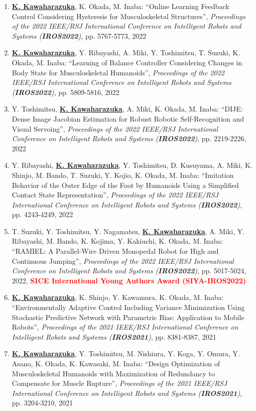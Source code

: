 \documentclass[letterpaper]{article}
\begin{document}
\begin{enumerate}
\item \underline{\textbf{K. Kawaharazuka}}, K. Okada, M. Inaba: ``Online Learning Feedback Control Considering Hysteresis for Musculoskeletal Structures'', \textit{Proceedings of the 2022 IEEE/RSJ International Conference on Intelligent Robots and Systems (\textit{\textbf{IROS2022}})}, pp. 5767-5773, 2022
\item \underline{\textbf{K. Kawaharazuka}}, Y. Ribayashi, A. Miki, Y. Toshimitsu, T. Suzuki, K. Okada, M. Inaba: ``Learning of Balance Controller Considering Changes in Body State for Musculoskeletal Humanoids'', \textit{Proceedings of the 2022 IEEE/RSJ International Conference on Intelligent Robots and Systems (\textit{\textbf{IROS2022}})}, pp. 5809-5816, 2022
\item Y. Toshimitsu, \underline{\textbf{K. Kawaharazuka}}, A. Miki, K. Okada, M. Inaba: ``DIJE: Dense Image Jacobian Estimation for Robust Robotic Self-Recognition and Visual Servoing'', \textit{Proceedings of the 2022 IEEE/RSJ International Conference on Intelligent Robots and Systems (\textit{\textbf{IROS2022}})}, pp. 2219-2226, 2022
\item Y. Ribayashi, \underline{\textbf{K. Kawaharazuka}}, Y. Toshimitsu, D. Kusuyama, A. Miki, K. Shinjo, M. Bando, T. Suzuki, Y. Kojio, K. Okada, M. Inaba: ``Imitation Behavior of the Outer Edge of the Foot by Humanoids Using a Simplified Contact State Representation'', \textit{Proceedings of the 2022 IEEE/RSJ International Conference on Intelligent Robots and Systems (\textit{\textbf{IROS2022}})}, pp. 4243-4249, 2022
\item T. Suzuki, Y. Toshimitsu, Y. Nagamatsu, \underline{\textbf{K. Kawaharazuka}}, A. Miki, Y. Ribayashi, M. Bando, K. Kojima, Y. Kakiuchi, K. Okada, M. Inaba: ``RAMIEL: A Parallel-Wire Driven Monopedal Robot for High and Continuous Jumping'', \textit{Proceedings of the 2022 IEEE/RSJ International Conference on Intelligent Robots and Systems (\textit{\textbf{IROS2022}})}, pp. 5017-5024, 2022, \textbf{\textcolor{red}{SICE International Young Authors Award (SIYA-IROS2022)}}
\item \underline{\textbf{K. Kawaharazuka}}, K. Shinjo, Y. Kawamura, K. Okada, M. Inaba: ``Environmentally Adaptive Control Including Variance Minimization Using Stochastic Predictive Network with Parametric Bias: Application to Mobile Robots'', \textit{Proceedings of the 2021 IEEE/RSJ International Conference on Intelligent Robots and Systems (\textit{\textbf{IROS2021}})}, pp. 8381-8387, 2021
\item \underline{\textbf{K. Kawaharazuka}}, Y. Toshimitsu, M. Nishiura, Y. Koga, Y. Omura, Y. Asano, K. Okada, K. Kawasaki, M. Inaba: ``Design Optimization of Musculoskeletal Humanoids with Maximization of Redundancy to Compensate for Muscle Rupture'', \textit{Proceedings of the 2021 IEEE/RSJ International Conference on Intelligent Robots and Systems (\textit{\textbf{IROS2021}})}, pp. 3204-3210, 2021

\end{enumerate}
\end{document}
